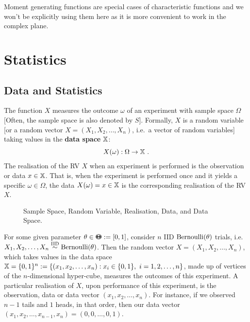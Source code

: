 Moment generating functions are special cases of characteristic functions and we won't be explicitly using them here as it is more convenient to work in the complex plane.



\section{Statistics}\label{S:Statistics}

\subsection{Data and Statistics}\label{S:DataStats}

\begin{definition}[Data]
The function $X$ measures the outcome $\omega$ of an experiment with sample space $\Omega$ [Often, the sample space is also denoted by $S$].  Formally, $X$ is a random variable [or a random vector $X=(X_1,X_2,\ldots,X_n)$, i.e.~a vector of random variables] taking  values in the {\bf data space} $\mathbb{X}$:
\[
X(\omega):\Omega \to \mathbb{X} \ .
\]
The realisation of the RV $X$ when an experiment is performed is the observation or data $x \in \mathbb{X}$.  That is, when the experiment is performed once and it yields a specific $\omega \in \Omega$, the data $X(\omega)=x \in \mathbb{X}$ is the corresponding realisation of the RV $X$.
\end{definition}

\begin{figure}[htpb]
\caption{Sample Space, Random Variable, Realisation, Data, and Data Space.\label{F:Data}}
\vspace{2.5in}
\end{figure}

\begin{example}
For some given parameter $\theta \in {\Theta}\mspace{-11 mu}{\Theta} := [0,1]$, consider $n$ IID $\mbox{{\rm Bernoulli}}(\theta)$ trials, i.e.~$X_1,X_2,\ldots,X_n \overset{{\rm IID}}{\sim} \mbox{{\rm Bernoulli}}(\theta)$.  Then the random vector $X=(X_1,X_2,\ldots,X_n)$, which takes values in the data space $\mathbb{X} = \{0,1\}^n := \{ (x_1,x_2,\ldots,x_n) : x_i \in \{0,1\}, \ i=1,2,\ldots,n \}$, made up of vertices of the $n$-dimensional hyper-cube, measures the outcomes of this experiment.  A particular realisation of $X$, upon performance of this experiment, is the observation, data or data vector $(x_1,x_2,\ldots,x_n)$.  For instance, if we observed $n-1$ tails and $1$ heads, in that order, then our data vector $(x_1,x_2,\ldots,x_{n-1},x_n) = (0,0,\ldots,0,1)$.
\end{example}

